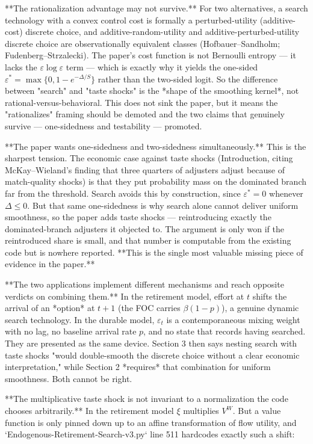**The rationalization advantage may not survive.** For two alternatives, a search technology with a convex control cost is formally a perturbed-utility (additive-cost) discrete choice, and additive-random-utility and additive-perturbed-utility discrete choice are observationally equivalent classes (Hofbauer–Sandholm; Fudenberg–Strzalecki). The paper's cost function is not Bernoulli entropy — it lacks the $\varepsilon\log\varepsilon$ term — which is exactly why it yields the one-sided $\varepsilon^*=\max\{0,1-e^{-\Delta/S}\}$ rather than the two-sided logit. So the difference between "search" and "taste shocks" is the *shape of the smoothing kernel*, not rational-versus-behavioral. This does not sink the paper, but it means the "rationalizes" framing should be demoted and the two claims that genuinely survive — one-sidedness and testability — promoted.

**The paper wants one-sidedness and two-sidedness simultaneously.** This is the sharpest tension. The economic case against taste shocks (Introduction, citing McKay–Wieland's finding that three quarters of adjusters adjust because of match-quality shocks) is that they put probability mass on the dominated branch far from the threshold. Search avoids this by construction, since $\varepsilon^*=0$ whenever $\Delta\le 0$. But that same one-sidedness is why search alone cannot deliver uniform smoothness, so the paper adds taste shocks — reintroducing exactly the dominated-branch adjusters it objected to. The argument is only won if the reintroduced share is small, and that number is computable from the existing code but is nowhere reported. **This is the single most valuable missing piece of evidence in the paper.**

**The two applications implement different mechanisms and reach opposite verdicts on combining them.** In the retirement model, effort at $t$ shifts the arrival of an *option* at $t+1$ (the FOC carries $\beta(1-p)$), a genuine dynamic search technology. In the durable model, $\varepsilon_t$ is a contemporaneous mixing weight with no lag, no baseline arrival rate $p$, and no state that records having searched. They are presented as the same device. Section 3 then says nesting search with taste shocks "would double-smooth the discrete choice without a clear economic interpretation," while Section 2 *requires* that combination for uniform smoothness. Both cannot be right.

**The multiplicative taste shock is not invariant to a normalization the code chooses arbitrarily.** In the retirement model $\xi$ multiplies $V^W$. But a value function is only pinned down up to an affine transformation of flow utility, and `Endogenous-Retirement-Search-v3.py` line 511 hardcodes exactly such a shift:

